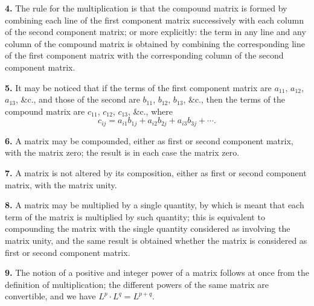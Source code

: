 \documentclass[12pt,a4paper]{article}
\theoremstyle{definition}
\begin{document}
\medskip
\noindent\textbf{4.} The rule for the multiplication is that the compound matrix is formed by combining each line of the first component matrix successively with each column of the second component matrix; or more explicitly: the term in any line and any column of the compound matrix is obtained by combining the corresponding line of the first component matrix with the corresponding column of the second component matrix.

\medskip
\noindent\textbf{5.} It may be noticed that if the terms of the first component matrix are $a_{11}$, $a_{12}$, $a_{13}$, \&c., and those of the second are $b_{11}$, $b_{12}$, $b_{13}$, \&c., then the terms of the compound matrix are $c_{11}$, $c_{12}$, $c_{13}$, \&c., where
\[c_{ij} = a_{i1}b_{1j} + a_{i2}b_{2j} + a_{i3}b_{3j} + \cdots.\]

\medskip
\noindent\textbf{6.} A matrix may be compounded, either as first or second component matrix, with the matrix zero; the result is in each case the matrix zero.

\medskip
\noindent\textbf{7.} A matrix is not altered by its composition, either as first or second component matrix, with the matrix unity.

\medskip
\noindent\textbf{8.} A matrix may be multiplied by a single quantity, by which is meant that each term of the matrix is multiplied by such quantity; this is equivalent to compounding the matrix with the single quantity considered as involving the matrix unity, and the same result is obtained whether the matrix is considered as first or second component matrix.

\medskip
\noindent\textbf{9.} The notion of a positive and integer power of a matrix follows at once from the definition of multiplication; the different powers of the same matrix are convertible, and we have $L^p \cdot L^q = L^{p+q}$.
\end{document}

